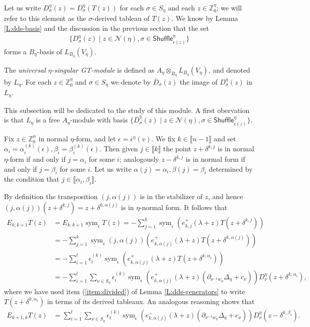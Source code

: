\documentclass[11pt,fleqn]{article}
\newcommand\ZZ{\mathbb Z}
\newcommand\D{\overline D}
\newcommand\N{\mathcal N}
\newcommand\ot{\otimes}
\newcommand\interval[1]{\llbracket #1 \rrbracket}
\newcommand\Shuffle{\mathsf{Shuffle}}
\DeclareMathOperator\sym{sym}
\begin{document}
Let us write $D_\sigma^\eta(z) = D_\sigma^\eta(T(z))$ for each $\sigma \in 
S_\eta$ and each $z \in \ZZ^\eta_0$; we will refer to this element as the 
$\sigma$-derived tableau of $T(z)$. We know by Lemma \ref{L:dds-basis} and the 
discussion in the previous section that the set 
\begin{align*}
\{D_\sigma^\eta(z) \mid z \in \N(\eta), 
  \sigma \in \Shuffle_{\epsilon(z)}^\eta\}
\end{align*}
forms a $B_\eta$-basis of $L_{B_\eta}(V_\eta)$.
\begin{Definition}
The \emph{universal $\eta$-singular GT-module} is defined as $A_\eta
\ot_{B_\eta} L_{B_\eta}(V_\eta)$, and denoted by $L_\eta$. For each $z \in 
\ZZ^\eta_0$ and $\sigma \in S_\eta$ we denote by $\D_\sigma(z)$ the image of 
$D^\eta_\sigma(z)$ in $L_\eta$.
\end{Definition}
This subsection will be dedicated to the study of this module. A first 
obervation is that $L_\eta$ is a free $A_\eta$-module with basis 
$\{\D_\sigma^\eta(z) \mid z \in \N(\eta), \sigma \in 
\Shuffle_{\epsilon(z)}^\eta\}$.

Fix $z \in \ZZ^\mu_0$ in normal $\eta$-form, and let $\epsilon = 
\epsilon^\eta(v)$. We fix $k \in \interval{n-1}$ and set $\alpha_i = 
\alpha_i^{(k)}(\epsilon), \beta_i = \beta_i^{(k)}(\epsilon)$. Then given
$j \in \interval {k}$ the point $z + \delta^{k,j}$ is in normal $\eta$-form if 
and only if $j = \alpha_i$ for some $i$; analogously $z - \delta^{k,j}$ is in 
normal form if and only if $j = \beta_i$ for some $i$. Let us write 
$\alpha(j) = \alpha_i, \beta(j) = \beta_i$ determined by the condition that
$j \in \interval{\alpha_i, \beta_i}$.

By definition the transposition $(j,\alpha(j))$ is in the stabilizer of $z$, 
and hence $(j,\alpha(j)) (z+\delta^{k,j}) = z + \delta^{k,\alpha(j)}$ is in 
$\eta$-normal form. It follows that
\begin{align*}
E_{k,k+1} T(z)
  &= E_{k,k+1} \sym_\epsilon T(z)
  = - \sum_{j=1}^k \sym_\epsilon \left( e_{k,j}^+(\lambda + z) 
    T(z + \delta^{k,j})\right) \\
  &= - \sum_{j=1}^k \sym_\epsilon (j,\alpha(j))\left( e_{k,\alpha(j)}^+
    (\lambda + z) T(z + \delta^{k,\alpha(j)})\right) \\
  &= - \sum_{i=1}^t \epsilon^{(k)}_i \sym_\epsilon\left( 
    e_{k,\alpha(j)}^+(\lambda + z) T(z + \delta^{k,\alpha_i})
  \right) \\
  &= - \sum_{i=1}^t \sum_{\nu \in S_\eta} 
  \epsilon^{(k)}_i \sym_\epsilon\left( 
    e_{k,\alpha(j)}^+(\lambda + z) (\partial_{\nu^{-1}w_\eta}\Delta_\eta 
      + c_\nu) 
  \right)  
  D_\nu^\eta (z + \delta^{k,\alpha_i}),
\end{align*}
where we have used item (\ref{item:divided}) of Lemma \ref{L:dds-generators} to
write $T(z+\delta^{k,\alpha_i})$ in terms of its derived tableaux. An 
analogous reasoning shows that 
\begin{align*}
E_{k+1,k} T(z)
  &= \sum_{i=1}^t \sum_{\nu \in S_\eta} 
  \epsilon^{(k)}_t \sym_\epsilon\left( 
    e_{k,\alpha(j)}^-(\lambda + z) (\partial_{\nu^{-1}w_\eta}\Delta_\eta 
      + c_\nu) 
  \right)  
  D_\nu^\eta (z - \delta^{k,\beta_i}).
\end{align*}
\end{document}
